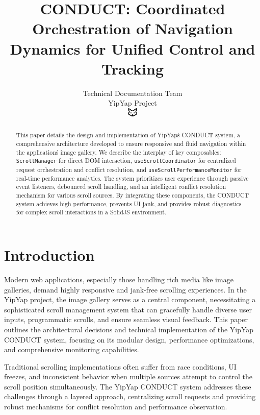 \documentclass[10pt]{article}
\begin{document}
\title{CONDUCT: Coordinated Orchestration of Navigation Dynamics for Unified Control and Tracking}

\author{Technical Documentation Team\\
YipYap Project\\
\includegraphics[width=0.5cm]{favicon.pdf}}

\maketitle

\begin{abstract}
This paper details the design and implementation of YipYap\'s CONDUCT system, 
a comprehensive architecture developed to ensure responsive and fluid navigation 
within the application\'s image gallery. We describe the interplay of key composables: 
\texttt{ScrollManager} for direct DOM interaction, \texttt{useScrollCoordinator} 
for centralized request orchestration and conflict resolution, and 
\texttt{useScrollPerformanceMonitor} for real-time performance analytics. 
The system prioritizes user experience through passive event listeners, 
debounced scroll handling, and an intelligent conflict resolution mechanism 
for various scroll sources. By integrating these components, the CONDUCT system 
achieves high performance, prevents UI jank, and provides robust diagnostics 
for complex scroll interactions in a SolidJS environment.
\end{abstract}

\section{Introduction}

Modern web applications, especially those handling rich media like image galleries, demand highly responsive and jank-free scrolling experiences. In the YipYap project, the image gallery serves as a central component, necessitating a sophisticated scroll management system that can gracefully handle diverse user inputs, programmatic scrolls, and ensure seamless visual feedback. This paper outlines the architectural decisions and technical implementation of the YipYap CONDUCT system, focusing on its modular design, performance optimizations, and comprehensive monitoring capabilities.

Traditional scrolling implementations often suffer from race conditions, UI freezes, and inconsistent behavior when multiple sources attempt to control the scroll position simultaneously. The YipYap CONDUCT system addresses these challenges through a layered approach, centralizing scroll requests and providing robust mechanisms for conflict resolution and performance observation.
\end{document}
